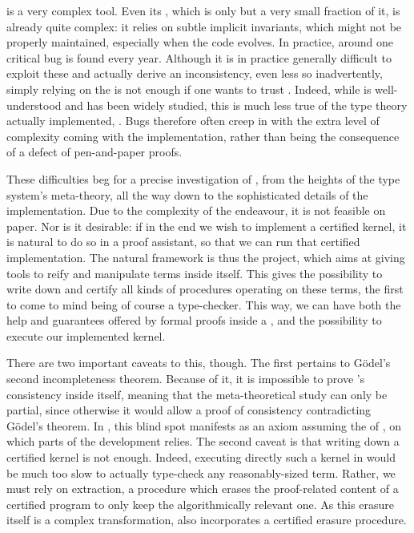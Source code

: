  is a very complex tool. Even its , which is only but a very small
fraction of it, is already quite complex: it relies on subtle implicit invariants, which
might not be properly maintained, especially when the code evolves.
In practice, around one critical bug is found every year.%
Although it is in practice generally difficult to exploit these
and actually derive an inconsistency,
even less so inadvertently, simply relying on the %
is not enough if one wants to trust .
Indeed, while  is well-understood and has been widely studied,
this is much less true of the type theory actually implemented, .
Bugs therefore often creep in with the extra level of complexity coming with the implementation,
rather than being the consequence of a defect of pen-and-paper proofs.%

These difficulties beg for a precise investigation of , from the heights of the
type system’s meta-theory, all the way down to the sophisticated details of the implementation.
Due to the complexity of the endeavour, it is not feasible on paper. Nor is it
desirable: if in the end we wish to implement a certified kernel, it is natural to do so
in a proof assistant, so that we can run that certified implementation.
The natural framework is thus the  project,
which aims at giving tools to reify and manipulate  terms%
inside  itself. This gives the possibility to write down and certify
all kinds of procedures operating on these terms, the first to come to mind being of course
a type-checker. This way, we can have both the help and guarantees offered by
formal proofs inside a , and the possibility to execute
our implemented kernel.

There are two important caveats to this, though.
The first pertains to Gödel’s second incompleteness
theorem. Because of it, it is impossible to prove ’s consistency
inside  itself,
meaning that the meta-theoretical study can only be partial, since otherwise it would allow
a proof of consistency contradicting Gödel’s theorem. In
, this blind spot manifests as an axiom assuming the
 of , on which parts of the development relies.
The second caveat is that writing down a certified kernel is not enough.
Indeed, executing directly such a kernel in 
would be much too slow to actually type-check any reasonably-sized term.
Rather, we must rely on extraction, a procedure which erases the
proof-related content of a certified program to only keep the algorithmically relevant one.
As this erasure itself is a complex transformation,  also incorporates a certified
erasure procedure.

